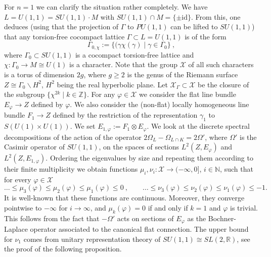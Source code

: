 \documentclass[10]{amsart}
\theoremstyle{remark}
\theoremstyle{definition}
\numberwithin{equation}{section}
\newcommand{\R}{\mathbb{R}}           %
\newcommand{\N}{\mathbb{N}}           %
\newcommand{\Z}{\mathbb{Z}}         %
\newcommand{\id}{\mathrm{id}}
\newcommand{\vp}{\varphi}
\newcommand{\Cal}{\mathcal}
\begin{document}
{For $n=1$ we can clarify the situation rather completely. We have $L=U(1,1)=SU(1,1)\cdot M$ with $SU(1,1)\cap M=\{\pm\id\}$. From this, one deduces (using that the projection of $\Gamma$ to $PU(1,1)$ can be lifted to $SU(1,1)$) that any torsion-free cocompact lattice $\Gamma \subset L=U(1,1)$ is of the form
$$\Gamma_{0,\chi}:=\{(\gamma\chi(\gamma)\mid \gamma\in\Gamma_0\}\ ,$$
where $\Gamma_0\subset SU(1,1)$ is a cocompact torsion-free lattice and $\chi:\Gamma_0\rightarrow M
\cong U(1)$ is a character. Note that the group ${\Cal X}$ of all such characters
is a torus of dimension $2g$, where $g\ge 2$ is the genus of the Riemann surface $Z\cong\Gamma_0\backslash H^2$, $H^2$ being the real hyperbolic plane.
Let ${\Cal X}_\Gamma\subset {\Cal X}$ be the closure of the subgroup $\{\chi^{2k}\mid k\in\Z\}$. For any $\vp\in {\Cal X}$ we consider the flat line bundle $E_\vp\rightarrow Z$ defined by $\vp$. We also consider the (non-flat) locally homogeneous line bundle $F_1\rightarrow Z$ defined
by the restriction of the representation $\gamma_1$ to $S(U(1)\times U(1))$. We set $E_{1,\vp}:=F_1\otimes E_\vp$. We look at the discrete spectral decompositions  of
the action of the operator $2\Omega_L-\Omega_{L\cap K}=2\Omega'$, where $\Omega'$ is the Casimir operator of $SU(1,1)$, on the spaces of sections $L^2(Z,E_\vp)$ and  $L^2(Z,E_{1,\vp})$.
Ordering the eigenvalues by size and repeating them according to their finite multiplicity we obtain functions
$\mu_i,\nu_i: {\Cal X}\rightarrow (-\infty, 0]$, $i\in\N$, such that for every $\vp\in{\Cal X}$ 
$$ \dots\le \mu_3(\vp)\le\mu_2(\vp)\le \mu_1(\vp)\le 0\ ,\qquad \dots\le \nu_3(\vp)\le\nu_2(\vp)\le \nu_1(\vp)\le -1 .$$
It is well-known that these functions are continuous. Moreover,  they converge pointwise to $-\infty$ for $i\to\infty$, and $\mu_k(\vp)=0$ if and only if $k=1$ and $\vp$ is trivial.
This follows from the fact that $-\Omega'$ acts on sections of $E_\vp$ as the Bochner-Laplace operator associated to the canonical flat connection. The upper bound for $\nu_1$ comes from unitary representation theory of $SU(1,1)\cong SL(2,\R)$, see the proof of the following proposition.

}
\end{document}
